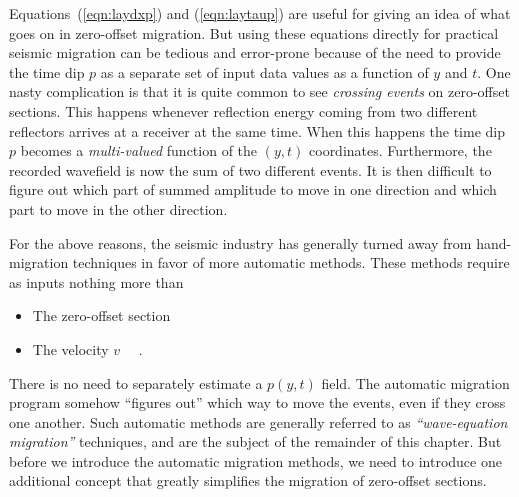 \par
Equations~(\ref{eqn:laydxp}) and (\ref{eqn:laytaup}) 
are useful for giving an idea of what goes on in zero-offset migration.
But using these equations directly for practical seismic migration 
can be tedious and error-prone 
because of the need to provide the time dip $p$ as a separate
set of input data values as a function of $y$ and $t$.  
One nasty complication is that it is quite common
to see {\em crossing events} on zero-offset sections.
This happens whenever reflection energy coming from two different reflectors
arrives at a receiver at the same time.  
When this happens the time dip $p$
becomes a {\em multi-valued} function of the $(y,t)$ coordinates.
Furthermore, the recorded wavefield is now the sum of two different events.
It is then difficult to figure out which part of summed amplitude
to move in one direction and which part to move in the other direction.

\par
For the above reasons,
the seismic industry has generally turned away from hand-migration techniques
in favor of more automatic methods.
These methods require as inputs nothing more than 
\begin{itemize}
\item The zero-offset section 
\item The velocity $v$  \ \ .
\end{itemize}
There is no need to separately estimate a $p(y,t)$ field.
The automatic migration program somehow ``figures out''
which way to move the events,
even if they cross one another.
Such automatic methods are generally referred to as
{\em ``wave-equation migration''}  techniques,
and are the subject of the remainder of this chapter.
But before we introduce the automatic migration methods,
we need to introduce one additional concept
that greatly simplifies the migration of zero-offset sections.

